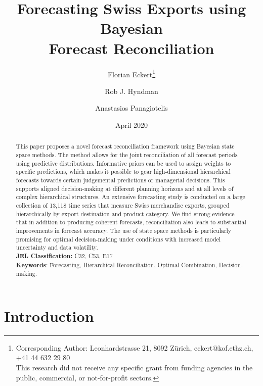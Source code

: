 \documentclass[a4paper,fleqn,11pt]{article}
\begin{document}
\title{\huge Forecasting Swiss Exports using Bayesian \\Forecast Reconciliation}

\author[$\dagger$]{Florian Eckert\thanks{Corresponding Author: Leonhardstrasse 21, 8092 Zürich, eckert@kof.ethz.ch, +41 44 632 29 80\\This research did not receive any specific grant from funding agencies in the public, commercial, or not-for-profit sectors.}}
\author[$\ddagger$]{Rob J. Hyndman}
\author[$\ddagger$]{Anastasios Panagiotelis}
\date{April 2020}

\clearpage\maketitle
\thispagestyle{empty}

\begin{abstract}
	\noindent This paper proposes a novel forecast reconciliation framework using Bayesian state space methods. The method allows for the joint reconciliation of all forecast periods using predictive distributions. Informative priors can be used to assign weights to specific predictions, which makes it possible to gear high-dimensional hierarchical forecasts towards certain judgemental predictions or managerial decisions. This supports aligned decision-making at different planning horizons and at all levels of complex hierarchical structures. An extensive forecasting study is conducted on a large collection of 13,118 time series that measure Swiss merchandise exports, grouped hierarchically by export destination and product category. We find strong evidence that in addition to producing coherent forecasts, reconciliation also leads to substantial improvements in forecast accuracy. The use of state space methods is particularly promising for optimal decision-making under conditions with increased model uncertainty and data volatility. \\
	
	\noindent \textbf{JEL Classification:} C32, C53, E17\\
	\noindent \textbf{Keywords}: Forecasting, Hierarchical Reconciliation, Optimal Combination, Decision-making.
\end{abstract}
\clearpage
\setcounter{page}{1}

\section{Introduction}\label{sec:intro}
\end{document}
